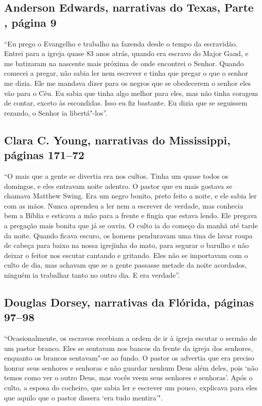 \subsection{Anderson Edwards, narrativas do Texas, Parte , página 9} \label{ref80}

``Eu prego o Evangelho e trabalho na fazenda desde o tempo da
escravidão. Entrei para a igreja quase 83 anos atrás, quando era escravo
do Major Gaud, e me batizaram na nascente mais próxima de onde encontrei
o Senhor. Quando comecei a pregar, não sabia ler nem escrever e tinha
que pregar o que o senhor me dizia. Ele me mandava dizer para os negros
que se obedecerem o senhor eles vão para o Céu. Eu sabia que tinha algo
melhor para eles, mas não tinha coragem de contar, exceto às escondidas.
Isso eu fiz bastante. Eu dizia que se seguissem rezando, o Senhor ia
libertá"-los''.

\subsection{Clara C. Young, narrativas do Mississippi, páginas 171--72}
\label{ref322}

``﻿O mais que a gente se divertia era nos cultos. Tinha um quase todos
os domingos, e eles entravam noite adentro. O pastor que eu mais gostava
se chamava Matthew Swing. Era um negro bonito, preto feito a noite, e
ele sabia ler com as mãos. Nunca aprendeu a ler nem a escrever de
verdade, mas conhecia bem a Bíblia e esticava a mão para a frente e
fingia que estava lendo. Ele pregava a pregação mais bonita que já se
ouviu. O culto ia do começo da manhã até tarde da noite. Quando ficava
escuro, os homens penduravam uma tina de lavar roupa de cabeça para
baixo na nossa igrejinha do mato, para segurar o barulho e não deixar o
feitor nos escutar cantando e gritando. Eles não se importavam com o
culto de dia, mas achavam que se a gente passasse metade da noite
acordados, ninguém ia trabalhar tanto no outro dia. E era verdade''.

\subsection{Douglas Dorsey, narrativas da Flórida, páginas 97--98} \label{ref71}

``Ocasionalmente, os escravos recebiam a ordem de ir à igreja escutar o
sermão de um pastor branco. Eles se sentavam nos bancos da frente da
igreja dos senhores, enquanto os brancos sentavam"-se ao fundo. O pastor
os advertia que era preciso honrar seus senhores e senhoras e não
guardar nenhum Deus além deles, pois `não temos como ver o outro Deus,
mas vocês veem seus senhores e senhoras'. Após o culto, a esposa do
cocheiro, que sabia ler e escrever um pouco, explicava para eles que
aquilo que o pastor dissera `era tudo mentira'".

